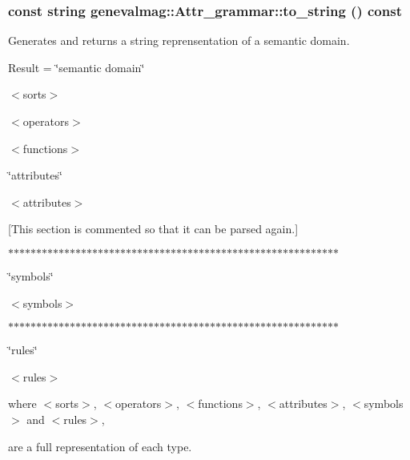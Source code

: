 \hypertarget{classgenevalmag_1_1Attr__grammar_ad2f2da693afe958a6dc84078c391100e}{
\subsubsection[{to\_\-string}]{\setlength{\rightskip}{0pt plus 5cm}const string genevalmag::Attr\_\-grammar::to\_\-string () const}}
\label{classgenevalmag_1_1Attr__grammar_ad2f2da693afe958a6dc84078c391100e}
Generates and returns a string reprensentation of a semantic domain.\par
 \par
 Result = \char`\"{}semantic domain\char`\"{}\par
 $<$sorts$>$\par
 $<$operators$>$\par
 $<$functions$>$\par
 \par
 \char`\"{}attributes\char`\"{}\par
 $<$attributes$>$\par
 \par
 \mbox{[}This section is commented so that it can be parsed again.\mbox{]}\par
 $\ast$$\ast$$\ast$$\ast$$\ast$$\ast$$\ast$$\ast$$\ast$$\ast$$\ast$$\ast$$\ast$$\ast$$\ast$$\ast$$\ast$$\ast$$\ast$$\ast$$\ast$$\ast$$\ast$$\ast$$\ast$$\ast$$\ast$$\ast$$\ast$$\ast$$\ast$$\ast$$\ast$$\ast$$\ast$$\ast$$\ast$$\ast$$\ast$$\ast$$\ast$$\ast$$\ast$$\ast$$\ast$$\ast$$\ast$$\ast$$\ast$$\ast$$\ast$$\ast$$\ast$$\ast$$\ast$$\ast$$\ast$$\ast$$\ast$\par
 \char`\"{}symbols\char`\"{}\par
 $<$symbols$>$\par
 $\ast$$\ast$$\ast$$\ast$$\ast$$\ast$$\ast$$\ast$$\ast$$\ast$$\ast$$\ast$$\ast$$\ast$$\ast$$\ast$$\ast$$\ast$$\ast$$\ast$$\ast$$\ast$$\ast$$\ast$$\ast$$\ast$$\ast$$\ast$$\ast$$\ast$$\ast$$\ast$$\ast$$\ast$$\ast$$\ast$$\ast$$\ast$$\ast$$\ast$$\ast$$\ast$$\ast$$\ast$$\ast$$\ast$$\ast$$\ast$$\ast$$\ast$$\ast$$\ast$$\ast$$\ast$$\ast$$\ast$$\ast$$\ast$$\ast$\par
 \char`\"{}rules\char`\"{}\par
 $<$rules$>$\par
 \par
 where $<$sorts$>$, $<$operators$>$, $<$functions$>$, $<$attributes$>$, $<$symbols$>$ and $<$rules$>$,\par
 are a full representation of each type.\par


